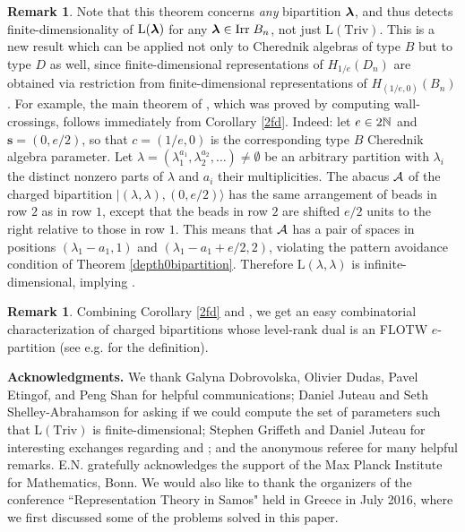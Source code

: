 \documentclass[12pt]{amsart}
\numberwithin{equation}{section}
\theoremstyle{definition}
\newtheorem{remark}[equation]{Remark}
\newcommand{\el}{\mathrm{L}}
\newcommand{\emp}{\emptyset}
\newcommand{\mbs}{\mathbf{s}}
\newcommand{\triv}{\mathrm{Triv}}
\begin{document}
\begin{remark} Note that this theorem concerns \textit{any} bipartition $\boldsymbol{\lambda}$, and thus detects finite-dimensionality of $\el(\bla)$ for any $\boldsymbol{\lambda}\in\text{\rm Irr}\;  B_n$,  not just $\el(\triv)$. This is a new result which can be applied not only to Cherednik algebras of type $B$ but to type $D$ as well, since finite-dimensional representations of $H_{1/e}(D_n)$ are obtained via restriction from finite-dimensional representations of $H_{(1/e,0)}(B_n)$. For example, the main theorem of \cite{Shelley-AbrahamsonSun2016}, which was proved by computing wall-crossings, follows immediately from Corollary \ref{2fd}. Indeed: let $e\in2\mathbb{N}$ and  $\mbs=(0,e/2)$, so that $c=(1/e,0)$ is the corresponding type $B$ Cherednik algebra parameter. Let $\lambda=(\lambda_1^{a_1},\lambda_2^{a_2},\dots)\neq \emp$ be an arbitrary partition with $\lambda_i$ the distinct nonzero parts of $\lambda$ and $a_i$ their multiplicities. The abacus $\mathcal{A}$ of the charged bipartition $|(\lambda,\lambda),(0,e/2)\rangle$ has the same arrangement of beads in row $2$ as in row $1$, except that the beads in row $2$ are shifted $e/2$ units to the right relative to those in row $1$. This means that $\mathcal{A}$ has a pair of spaces in positions $(\lambda_1-a_1,1)$ and $(\lambda_1-a_1+e/2,2)$, violating the pattern avoidance condition of Theorem \ref{depth0bipartition}. Therefore $\el(\lambda,\lambda)$ is infinite-dimensional, implying \cite[Theorem 2.1]{Shelley-AbrahamsonSun2016}.
\end{remark}

\begin{remark}
Combining Corollary \ref{2fd} and \cite[Theorem 7.7]{Gerber2016}, we get an easy combinatorial characterization
of charged bipartitions whose level-rank dual is an FLOTW $e$-partition (see e.g. \cite[Definition 5.7.8]{GeckJacon2011} for the definition).
\end{remark}

\textbf{Acknowledgments.} We thank Galyna Dobrovolska, Olivier Dudas, Pavel Etingof, and Peng Shan for helpful communications; Daniel Juteau and Seth Shelley-Abrahamson for asking if we could compute the set of parameters such that $\el(\triv)$ is finite-dimensional; Stephen Griffeth and Daniel Juteau for interesting exchanges regarding \cite{GGJL} and \cite{GriffethJuteau2017}; and the anonymous referee for many helpful remarks. E.N. gratefully acknowledges the support of the Max Planck Institute for Mathematics, Bonn. We would also like to thank the organizers of the conference ``Representation Theory in Samos" held in Greece in July 2016, where we first discussed some of the problems solved in this paper.
\end{document}
